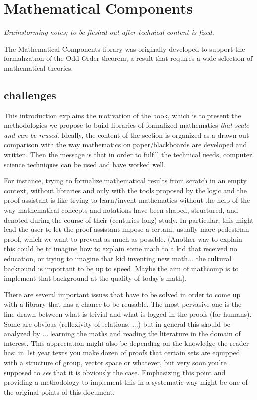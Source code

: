 \setcounter{chapter}{-1}
\chapter{Mathematical Components}

\emph{Brainstorming notes; to be fleshed out after technical content is fixed.}

The Mathematical Components library was originally developed to
support the formalization of the Odd Order theorem, a result that
requires a wide selection of mathematical theories.

\section{challenges}

This introduction explains the motivation of the book, which is to
present the methodologies we propose to build libraries of formalized
mathematics \emph{that scale and can be reused}. Ideally, the content
of the section is organized as a drawn-out comparison with the way
mathematics on paper/blackboards are developed and written. Then the
message is that in order to fulfill the technical needs, computer
science techniques can be used and have worked well.

For instance, trying to formalize mathematical results from scratch in
an empty context, without libraries and only with the tools proposed
by the logic and the proof assistant is like trying to learn/invent
mathematics without the help of the way mathematical concepts and
notations have been shaped, structured, and denoted during the course
of their (centuries long) study.
In particular, this might lead the user to let the
proof assistant impose a certain, usually more pedestrian proof, which
we want to prevent as much as possible.
(Another way to explain this could be to imagine how to explain some math
to a kid that received no education, or trying to imagine that kid
inventing new math... the cultural backround is important to be up to
speed. Maybe the aim of mathcomp is to implement that background at the
quality of today's math).

There are several important issues that have to be solved in order to
come up with a library that has a chance to be reusable. The most
pervasive one is the line drawn between what is trivial and what is
logged in the proofs (for humans). Some are obvious (reflexivity of
relations, ...) but in general this should be analyzed by
... learning the maths and reading the literature in the domain of
interest. This appreciation might also be depending on the knowledge
the reader has: in 1st year texts you make dozen of proofs that
certain sets are equipped with a structure of group, vector space or
whatever, but very soon you're supposed to \emph{see} that it is
obviously the case. Emphasizing this point and providing a methodology to
implement this in a systematic way might be one of the original points
of this document. 

